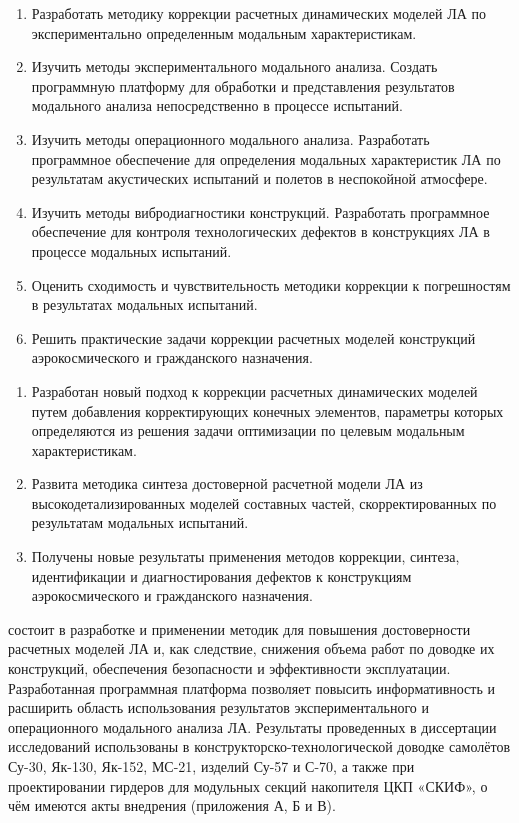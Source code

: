 {\tasks}
\begin{enumerate}[beginpenalty = 10000] 
	\item Разработать методику коррекции расчетных динамических моделей ЛА по экспериментально определенным модальным характеристикам.
	\item Изучить методы экспериментального модального анализа. Создать программную платформу для обработки и представления результатов модального анализа непосредственно в процессе испытаний. 
	\item Изучить методы операционного модального анализа. Разработать программное обеспечение для определения модальных характеристик ЛА по результатам акустических испытаний и полетов в неспокойной атмосфере.
	\item Изучить методы вибродиагностики конструкций. Разработать программное обеспечение для контроля технологических дефектов в конструкциях ЛА в процессе модальных испытаний. 
	\item Оценить сходимость и чувствительность методики коррекции к погрешностям в результатах модальных испытаний. 
	\item Решить практические задачи коррекции расчетных моделей конструкций аэрокосмического и гражданского назначения.
\end{enumerate}

{\novelty}
\begin{enumerate}[beginpenalty = 10000] 
	\item Разработан новый подход к коррекции расчетных динамических моделей путем добавления корректирующих конечных элементов, параметры которых определяются из решения задачи оптимизации по целевым модальным характеристикам.
	\item Развита методика синтеза достоверной расчетной модели ЛА из высокодетализированных моделей составных частей, скорректированных по результатам модальных испытаний.
	\item Получены новые результаты применения методов коррекции, синтеза, идентификации и диагностирования дефектов к конструкциям аэрокосмического и гражданского назначения.
\end{enumerate}

{\influence} состоит в разработке и применении методик для повышения достоверности расчетных моделей ЛА и, как следствие, снижения объема работ по доводке их конструкций, обеспечения безопасности и эффективности эксплуатации. Разработанная программная платформа позволяет повысить информативность и расширить область использования результатов экспериментального и операционного модального анализа ЛА.
Результаты проведенных в диссертации исследований использованы в конструкторско-технологической доводке самолётов Су-30, Як-130, Як-152, МС-21, изделий Су-57 и С-70, а также при проектировании гирдеров для модульных секций накопителя ЦКП «СКИФ», о чём имеются акты внедрения (приложения А, Б и В).

